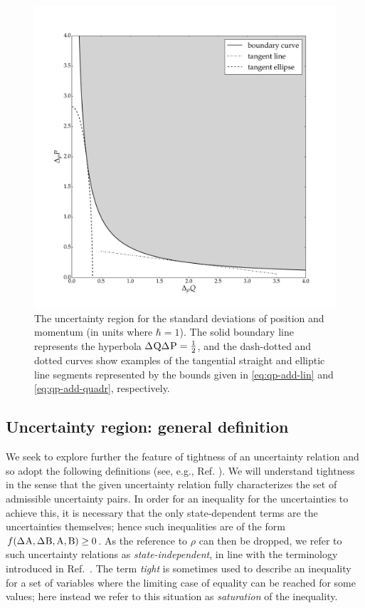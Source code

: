  \begin{figure}[ht]
    \includegraphics[width=\textwidth]{figs/qp-error-region}
    \caption[The uncertainty region for the standard deviations of position and momentum.]{The uncertainty region for the standard deviations of position and momentum (in units where $\hbar = 1$). The solid boundary line represents the hyperbola $\sdev{\opq}\sdev{\opp}=\frac{1}{2}$, and the dash-dotted and dotted curves show examples of the tangential straight and elliptic line segments represented by the bounds given in \eqref{eq:qp-add-lin} and \eqref{eq:qp-add-quadr}, respectively.}\label{fig:QP-UR}
  \end{figure}


\subsection{Uncertainty region: general definition}\label{sec:pur-def}
We seek to explore further the feature of tightness of an uncertainty relation  and so adopt the following definitions (see, e.g., Ref. \cite{abbott-state-indep-qubits}).
We will understand tightness in the sense that the given uncertainty relation fully characterizes the set of admissible uncertainty pairs. In order for an inequality for the uncertainties to achieve this, it is necessary that the only state-dependent terms are the uncertainties themselves; hence such inequalities are of the form $f(\sdev{\opa},\sdev{\opb}, \opa,\opb)\ge 0$. As the reference to $\rho$ can then be dropped, we refer to such uncertainty relations as {\em state-independent}, in line with the terminology introduced in  Ref.~\cite{abbott-state-indep-qubits}.
The term {\em tight} is sometimes used to describe an inequality for a set of variables where the limiting case of equality can be reached for some values; here instead we refer to this situation as {\em saturation} of the inequality. 

